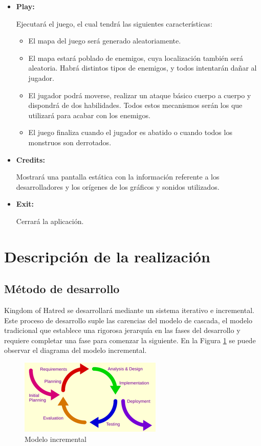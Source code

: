 		\begin{itemize}
			\item \textbf{Play:}

			Ejecutará el juego, el cual tendrá las siguientes características:

			\begin{itemize}
					\item El mapa del juego será generado aleatoriamente.
					\item El mapa estará poblado de enemigos, cuya localización también será aleatoria. Habrá distintos tipos de enemigos, y todos intentarán dañar al jugador.
					\item El jugador podrá moverse, realizar un ataque básico cuerpo a cuerpo y dispondrá de dos habilidades. Todos estos mecanismos serán los que utilizará para acabar con los enemigos.
					\item El juego finaliza cuando el jugador es abatido o cuando todos los monstruos son derrotados.
			\end{itemize}
			\item \textbf{Credits:}

			Mostrará una pantalla estática con la información referente a los desarrolladores y los orígenes de los gráficos y sonidos utilizados.

			\item \textbf{Exit:}

			Cerrará la aplicación.
		\end{itemize}

	\section{Descripción de la realización}

		\subsection{Método de desarrollo}

			Kingdom of Hatred se desarrollará mediante un sistema iterativo e incremental. Este proceso de desarrollo suple las carencias del modelo de cascada, el modelo tradicional que establece una rigorosa jerarquía en las fases del desarrollo y requiere completar una fase para comenzar la siguiente. En la Figura \ref{fig:modeloI} se puede observar el diagrama del modelo incremental.

			\begin{figure}[!htp]
			 \centering
			 \includegraphics{fig/modelo_incremental}
			 \caption{Modelo incremental}
			 \label{fig:modeloI}
			\end{figure}

